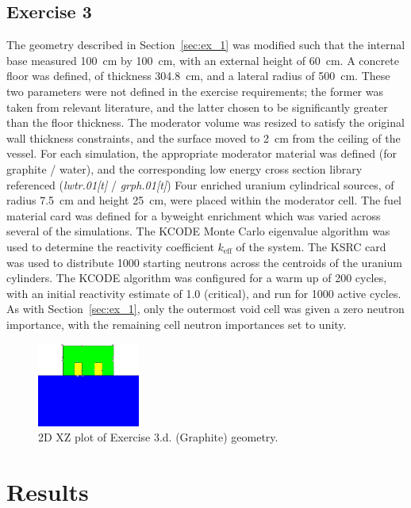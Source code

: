 \documentclass{article}
\begin{document}
  \subsection{Exercise 3}
    The geometry described in Section~\ref{sec:ex_1} was modified such that the internal base measured \SI{100}{\cm} by \SI{100}{\cm}, with an external height of \SI{60}{\cm}.
    A concrete floor was defined, of thickness \SI{304.8}{\cm}, and a lateral radius of \SI{500}{\cm}. These two parameters were not defined in the exercise requirements; the former was taken from relevant literature, and the latter chosen to be significantly greater than the floor thickness. %
    The moderator volume was resized to satisfy the original wall thickness constraints, and the surface moved to \SI{2}{\cm} from the ceiling of the vessel. For each simulation, the appropriate moderator material was defined (for graphite / water), and the corresponding low energy cross section library referenced (\textit{lwtr.01[t]} / \textit{grph.01[t]})
    Four enriched uranium cylindrical sources, of radius \SI{7.5}{\cm} and height \SI{25}{\cm}, were placed within the moderator cell. The fuel material card was defined for a by\textendash weight enrichment which was varied across several of the simulations.
    The KCODE Monte Carlo eigenvalue algorithm was used to determine the reactivity coefficient $k_{\text{eff}}$ of the system. The KSRC card was used to distribute 1000 starting neutrons across the centroids of the uranium cylinders. The KCODE algorithm was configured for a warm up of 200 cycles, with an initial reactivity estimate of 1.0 (critical), and run for 1000 active cycles. As with Section~\ref{sec:ex_1}, only the outermost void cell was given a zero neutron importance, with the remaining cell neutron importances set to unity.
    \begin{figure}[htb]
      \centering
      \includegraphics[width=0.3\textwidth]{criticality.png}
      \caption{2D XZ plot of Exercise 3.d. (Graphite) geometry.}
      \label{fig:ex_3_d_2_geometry}
    \end{figure}

\section{Results}
\end{document}
